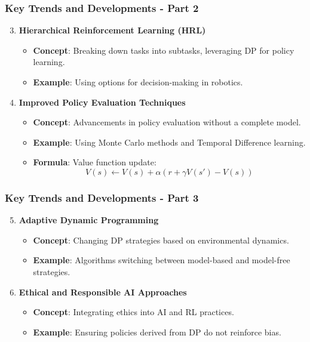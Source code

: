 \documentclass[aspectratio=169]{beamer}
\begin{document}
\begin{frame}[fragile]
    \frametitle{Key Trends and Developments - Part 2}
    \begin{enumerate}
        \setcounter{enumi}{2} %
        \item \textbf{Hierarchical Reinforcement Learning (HRL)}
            \begin{itemize}
                \item \textbf{Concept}: Breaking down tasks into subtasks, leveraging DP for policy learning.
                \item \textbf{Example}: Using options for decision-making in robotics.
            \end{itemize}
        
        \item \textbf{Improved Policy Evaluation Techniques}
            \begin{itemize}
                \item \textbf{Concept}: Advancements in policy evaluation without a complete model.
                \item \textbf{Example}: Using Monte Carlo methods and Temporal Difference learning.
                \item \textbf{Formula}: Value function update: 
                \begin{equation}
                    V(s) \gets V(s) + \alpha (r + \gamma V(s') - V(s))
                \end{equation}
            \end{itemize}
    \end{enumerate}
\end{frame}

\begin{frame}[fragile]
    \frametitle{Key Trends and Developments - Part 3}
    \begin{enumerate}
        \setcounter{enumi}{4} %
        \item \textbf{Adaptive Dynamic Programming}
            \begin{itemize}
                \item \textbf{Concept}: Changing DP strategies based on environmental dynamics.
                \item \textbf{Example}: Algorithms switching between model-based and model-free strategies.
            \end{itemize}
        
        \item \textbf{Ethical and Responsible AI Approaches}
            \begin{itemize}
                \item \textbf{Concept}: Integrating ethics into AI and RL practices.
                \item \textbf{Example}: Ensuring policies derived from DP do not reinforce bias.
            \end{itemize}
    \end{enumerate}
\end{frame}
\end{document}
